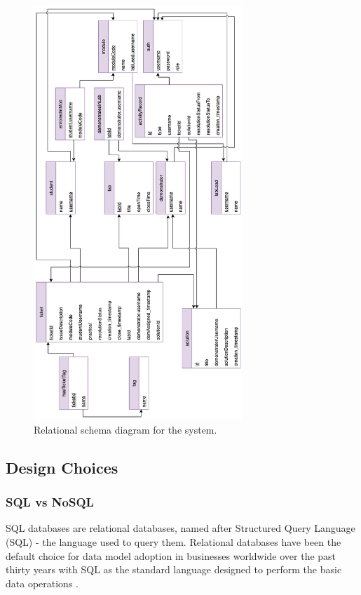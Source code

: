 \begin{figure}[H]
    \centering
    \includegraphics[width=0.7\textwidth]{7design/images/relationalSchema.png}
    \caption{Relational schema diagram for the system.}
    \label{fig:relationalschema}
\end{figure}

\subsection{Design Choices}

\subsubsection{SQL vs NoSQL}\label{whysql}

SQL databases are relational databases, named after Structured Query Language (SQL) - the language used to query them. Relational databases have been the default choice for data model adoption in businesses worldwide over the past thirty years with SQL as the standard language designed to perform the basic data operations \cite{Venkatraman}.

